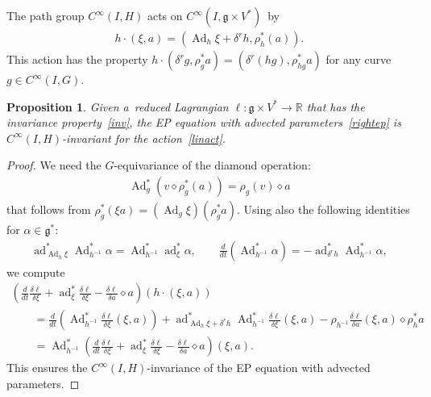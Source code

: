 \documentclass[pdftex]{sigma}
\numberwithin{equation}{section}
\newtheorem{Proposition}[Theorem]{Proposition}
{ \theoremstyle{definition}
\newtheorem{Example}[Theorem]{Example}
\newtheorem{Remark}[Theorem]{Remark} }
\begin{document}
The path group $C^{\infty}(I,H)$ acts on $C^{\infty}(I,\mathfrak g\times V^*)$~by
\begin{gather}
\label{linact}
h\cdot (\xi,a)=(\operatorname{Ad}_h\xi+\delta^rh,\rho^*_h(a)).
\end{gather}
This action has the property $h\cdot(\delta^rg,\rho^*_ga)=(\delta^r(hg),\rho^*_{hg}{a})$ for any curve $g\in
C^{\infty}(I,G)$.

\begin{Proposition}
\label{thmlinear}
Given a~reduced Lagrangian $\ell:\mathfrak g\times V^*\to\mathbb R$ that has the invariance pro\-per\-ty~\eqref{inv}, the EP
equation with advected parameters~\eqref{rightep} is $C^{\infty}(I,H)$-invariant for the action~\eqref{linact}.
\end{Proposition}

\begin{proof}
We need the $G$-equivariance of the diamond operation:
\begin{gather*}
\operatorname{Ad}^*_g(v\diamond\rho^*_g(a))=\rho_g(v)\diamond a
\end{gather*}
that follows from $\rho^*_g(\xi a)=(\operatorname{Ad}_g\xi)(\rho^*_ga)$.
Using also the following identities for $\alpha\in\mathfrak g^*$:
\begin{gather*}
\operatorname{ad}^*_{\operatorname{Ad}_h\xi}\operatorname{Ad}^*_{h^{-1}}\alpha=\operatorname{Ad}^*_{h^{-1}}\operatorname{ad}^*_\xi\alpha,
\qquad
\frac{d}{dt}(\operatorname{Ad}^*_{h^{-1}}\alpha) =-\operatorname{ad}^*_{\delta^rh}\operatorname{Ad}^*_{h^{-1}}\alpha,
\end{gather*}
we compute
\begin{gather*}
\left(\frac{d}{dt}\frac{\delta\ell}{\delta\xi}+\operatorname{ad}^*_\xi\frac{\delta
\ell}{\delta\xi}-\frac{\delta\ell}{\delta a}\diamond a\right)(h\cdot(\xi,a))
\\
\qquad
=\frac{d}{dt}\left(\operatorname{Ad}^*_{h^{-1}}\frac{\delta \ell}{\delta\xi}(\xi,a)\right)
+\operatorname{ad}^*_{\operatorname{Ad}_h\xi+\delta^rh}\operatorname{Ad}^*_{h^{-1}}\frac{\delta\ell}{\delta\xi}(\xi,a)
-\rho_{h^{-1}}\frac{\delta\ell}{\delta a}(\xi,a)\diamond\rho^*_ha
\\
\qquad
=\operatorname{Ad}^*_{h^{-1}}\left(\frac{d}{dt}\frac{\delta\ell}{\delta\xi}+\operatorname{ad}^*_\xi\frac{\delta
\ell}{\delta\xi}-\frac{\delta\ell}{\delta a}\diamond a\right)(\xi,a).
\end{gather*}
This ensures the $C^{\infty}(I,H)$-invariance of the EP equation with advected parameters.
\end{proof}
\end{document}
